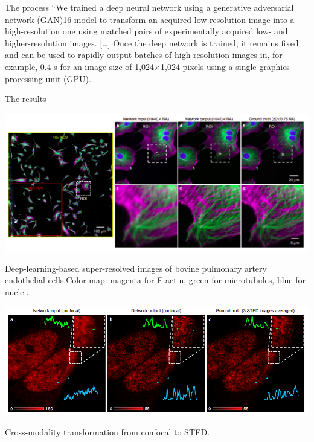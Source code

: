 \documentclass[9pt, aspectratio=169]{beamer}
\begin{document}
\begin{frame}
    {The process}
    ``We trained a deep neural network using a generative adversarial network (GAN)16 model to transform an acquired low-resolution image into a high-resolution one using matched pairs of experimentally acquired low- and  higher-resolution images. [\dots] Once the deep network is trained, it remains fixed and can be used to rapidly output batches of high-resolution images in, for
    example, 0.4 s for an image size of 1,024$\times$1,024 pixels using a single graphics processing unit (GPU).
\end{frame}

\begin{frame}
    {The results}
    \centering

    {
        \includegraphics[width=.8\textwidth]{wang_results.png}

        \footnotesize
        \raggedright
        Deep-learning-based super-resolved images of bovine pulmonary artery endothelial cells.Color map: magenta for F-actin, green for microtubules, blue for nuclei.
    }
    {
    \includegraphics[width=.8\textwidth]{confocal2sted.png}

    \footnotesize
    \raggedright
    Cross-modality transformation from confocal to STED.
    }
\end{frame}
\end{document}
